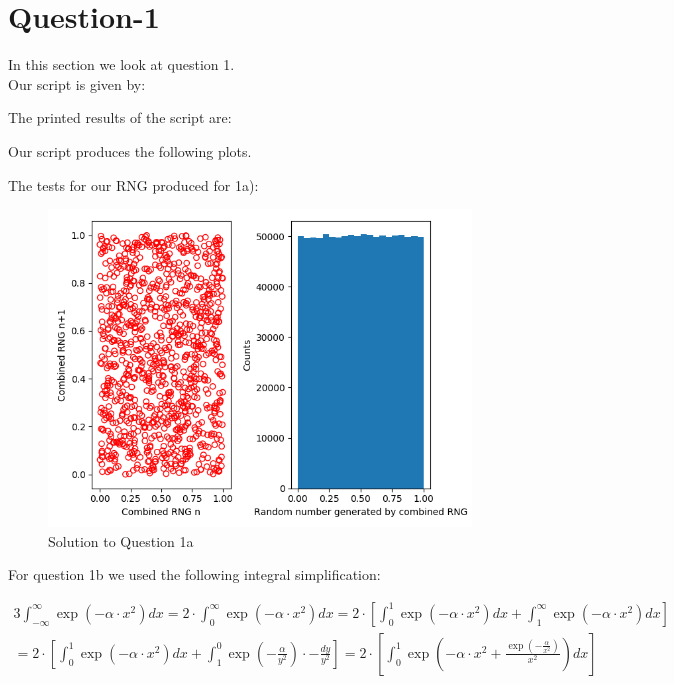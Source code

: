 \section{Question-1}

In this section we look at question 1. \\

Our script is given by:


The printed results of the script are:



Our script produces the following plots.

The tests for our RNG produced for 1a):

\begin{figure}[h!]
  \centering
  \includegraphics[width=0.9\linewidth]{./plots/RNG-test-results.png}
  \caption{Solution to Question 1a}
  \label{fig:fig1}
\end{figure}

For question 1b we used the following integral simplification:

\begin{alignat*}{3}
\int_{-\infty}^{\infty} \exp(-\alpha \cdot x^{2}) dx = 2 \cdot \int_{0}^{\infty} \exp(-\alpha \cdot x^{2}) dx = 2 \cdot [\int_{0}^{1} \exp(-\alpha \cdot x^{2}) dx + \int_{1}^{\infty} \exp(-\alpha \cdot x^{2}) dx] \\
= 2 \cdot [\int_{0}^{1} \exp(-\alpha \cdot x^{2}) dx + \int_{1}^{0} \exp(-\frac{\alpha}{y^{2}}) \cdot -\frac{dy}{y^{2}}] = 2 \cdot [\int_{0}^{1} \exp(-\alpha \cdot x^{2} + \frac{\exp(-\frac{\alpha}{x^{2}})}{x^{2}}) dx]
\end{alignat*}

